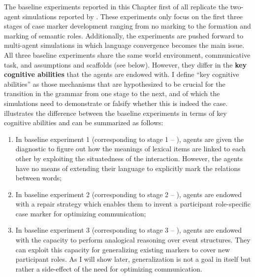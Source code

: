 The baseline experiments reported in this Chapter first of all replicate the two-agent simulations reported by \citet{steels02simulating, steels04constructivist}. These experiments only focus on the first three stages of case marker development ranging from no marking to the formation and marking of semantic roles. Additionally, the experiments are pushed forward to multi-agent simulations in which language convergence becomes the main issue. All three baseline experiments share the same world environment, communicative task, and assumptions and scaffolds (see below). However, they differ in the {\bfseries key cognitive abilities} that the agents are endowed with. I define ``key cognitive abilities'' as those mechanisms that are hypothesized to be crucial for the transition in the grammar from one stage to the next, and of which the simulations need to demonstrate or falsify whether this is indeed the case.  illustrates the difference between the baseline experiments in terms of key cognitive abilities and can be summarized as follows:

\begin{enumerate}
\item In baseline experiment 1 (corresponding to stage 1 -- ), agents are given the diagnostic to figure out how the meanings of lexical items are linked to each other by exploiting the situatedness of the interaction. However, the agents have no means of extending their language to explicitly mark the relations between words;
\item In baseline experiment 2 (corresponding to stage 2 -- ), agents are endowed with a repair strategy which enables them to invent a participant role-specific case marker for optimizing communication;
\item In baseline experiment 3 (corresponding to stage 3 -- ), agents are endowed with the capacity to perform analogical reasoning over event structures. They can exploit this capacity for generalizing existing markers to cover new participant roles. As I will show later, generalization is not a goal in itself but rather a side-effect of the need for optimizing communication.
\end{enumerate}

